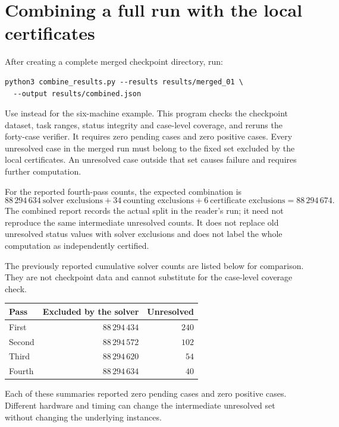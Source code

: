\documentclass[11pt]{article}
\newcommand{\file}[1]{\path{#1}}
\begin{document}
\section{Combining a full run with the local certificates}
\label{sec:combine}

After creating a complete merged checkpoint directory, run:
\begingroup\footnotesize
\begin{verbatim}
python3 combine_results.py --results results/merged_01 \
  --output results/combined.json
\end{verbatim}
\endgroup
Use \file{results/merged_six_01} instead for the six-machine example.
This program checks the checkpoint dataset, task ranges, status integrity
and case-level coverage, and reruns the forty-case verifier. It requires
zero pending cases and zero positive cases. Every unresolved case in
the merged run must belong to the fixed set excluded by the local
certificates. An unresolved case outside that set causes failure and
requires further computation.

For the reported fourth-pass counts, the expected combination is
\[
88\,294\,634\ \text{solver exclusions}
+34\ \text{counting exclusions}
+6\ \text{certificate exclusions}
=88\,294\,674.
\]
The combined report records the actual split in the reader's run; it
need not reproduce the same intermediate unresolved counts. It does
not replace old unresolved status values with solver exclusions and
does not label the whole computation as independently certified.

The previously reported cumulative solver counts are listed below for
comparison. They are not checkpoint data and cannot substitute for
the case-level coverage check.
\begin{center}
\begin{tabular}{@{}lrr@{}}
\toprule
Pass & Excluded by the solver & Unresolved \\
\midrule
First & $88\,294\,434$ & $240$ \\
Second & $88\,294\,572$ & $102$ \\
Third & $88\,294\,620$ & $54$ \\
Fourth & $88\,294\,634$ & $40$ \\
\bottomrule
\end{tabular}
\end{center}
Each of these summaries reported zero pending cases and zero positive
cases. Different hardware and timing can change the intermediate
unresolved set without changing the underlying instances.
\end{document}
